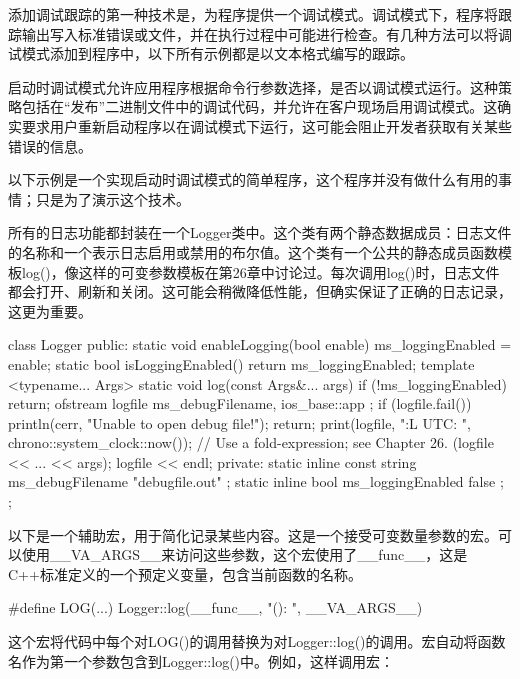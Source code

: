 
添加调试跟踪的第一种技术是，为程序提供一个调试模式。调试模式下，程序将跟踪输出写入标准错误或文件，并在执行过程中可能进行检查。有几种方法可以将调试模式添加到程序中，以下所有示例都是以文本格式编写的跟踪。


启动时调试模式允许应用程序根据命令行参数选择，是否以调试模式运行。这种策略包括在“发布”二进制文件中的调试代码，并允许在客户现场启用调试模式。这确实要求用户重新启动程序以在调试模式下运行，这可能会阻止开发者获取有关某些错误的信息。

以下示例是一个实现启动时调试模式的简单程序，这个程序并没有做什么有用的事情；只是为了演示这个技术。

所有的日志功能都封装在一个Logger类中。这个类有两个静态数据成员：日志文件的名称和一个表示日志启用或禁用的布尔值。这个类有一个公共的静态成员函数模板log()，像这样的可变参数模板在第26章中讨论过。每次调用log()时，日志文件都会打开、刷新和关闭。这可能会稍微降低性能，但确实保证了正确的日志记录，这更为重要。

\begin{cpp}
class Logger
{
    public:
        static void enableLogging(bool enable) { ms_loggingEnabled = enable; }
        static bool isLoggingEnabled() { return ms_loggingEnabled; }
        template <typename... Args>
        static void log(const Args&... args)
        {
            if (!ms_loggingEnabled) { return; }
            ofstream logfile { ms_debugFilename, ios_base::app };
            if (logfile.fail()) {
                println(cerr, "Unable to open debug file!");
                return;
            }
            print(logfile, "{:L} UTC: ", chrono::system_clock::now());
            // Use a fold-expression; see Chapter 26.
            (logfile << ... << args);
            logfile << endl;
        }
    private:
        static inline const string ms_debugFilename { "debugfile.out" };
        static inline bool ms_loggingEnabled { false };
};
\end{cpp}

以下是一个辅助宏，用于简化记录某些内容。这是一个接受可变数量参数的宏。可以使用\_\_VA\_ARGS\_\_来访问这些参数，这个宏使用了\_\_func\_\_，这是C++标准定义的一个预定义变量，包含当前函数的名称。

\begin{cpp}
#define LOG(...) Logger::log(__func__, "(): ", __VA_ARGS__)
\end{cpp}

这个宏将代码中每个对LOG()的调用替换为对Logger::log()的调用。宏自动将函数名作为第一个参数包含到Logger::log()中。例如，这样调用宏：

